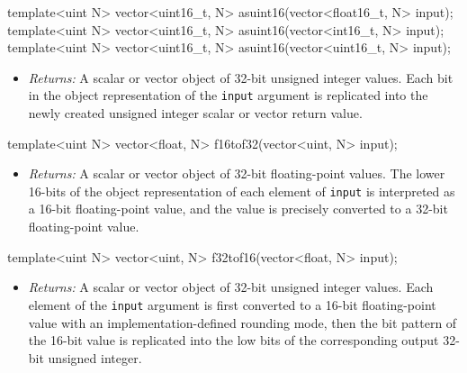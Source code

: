 \begin{HLSL}
template<uint N> vector<uint16\_t, N> asuint16(vector<float16\_t, N> input);
template<uint N> vector<uint16\_t, N> asuint16(vector<int16\_t, N> input);
template<uint N> vector<uint16\_t, N> asuint16(vector<uint16\_t, N> input);
\end{HLSL}

\begin{itemize}
  \item \textit{Returns:} A scalar or vector object of 32-bit unsigned integer
  values. Each bit in the object representation of the \texttt{input} argument
  is replicated into the newly created unsigned integer scalar or vector return
  value.
\end{itemize}

\begin{HLSL}
template<uint N> vector<float, N> f16tof32(vector<uint, N> input);
\end{HLSL}

\begin{itemize}
  \item \textit{Returns:} A scalar or vector object of 32-bit floating-point
  values. The lower 16-bits of the object representation of each element of
  \texttt{input} is interpreted as a 16-bit floating-point value, and the value
  is precisely converted to a 32-bit floating-point value.
\end{itemize}

\begin{HLSL}
template<uint N> vector<uint, N> f32tof16(vector<float, N> input);
\end{HLSL}

\begin{itemize}
  \item \textit{Returns:} A scalar or vector object of 32-bit unsigned integer
  values. Each element of the \texttt{input} argument is first converted to a
  16-bit floating-point value with an implementation-defined rounding mode, then
  the bit pattern of the 16-bit value is replicated into the low bits of the
  corresponding output 32-bit unsigned integer.
\end{itemize}

